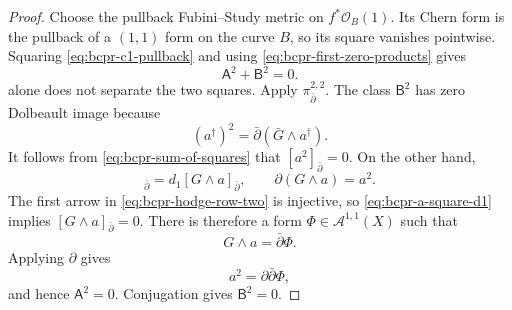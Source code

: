\begin{proof}
Choose the pullback Fubini--Study metric on
$f^*\mathcal O_B(1)$.  Its Chern form is the pullback of a $(1,1)$ form on
the curve $B$, so its square vanishes pointwise.  Squaring
\cref{eq:bcpr-c1-pullback} and using
\cref{eq:bcpr-first-zero-products} gives
\begin{equation}
 \mathsf A^2+\mathsf B^2=0.
\label{eq:bcpr-sum-of-squares}
\end{equation}
 alone does not separate the two
squares.  Apply $\pi_{\bar\partial}^{2,2}$.  The class
$\mathsf B^2$ has zero Dolbeault image because
\begin{equation}
 (a^\dagger)^2
 =\bar\partial(\bar G\wedge a^\dagger).
\label{eq:bcpr-b-square-dolbeault-zero}
\end{equation}
It follows from \cref{eq:bcpr-sum-of-squares} that
$[a^2]_{\bar\partial}=0$.  On the other hand,
\begin{equation}
 [a^2]_{\bar\partial}
 =d_1[G\wedge a]_{\bar\partial},
 \qquad
 \partial(G\wedge a)=a^2.
\label{eq:bcpr-a-square-d1}
\end{equation}
The first arrow in \cref{eq:bcpr-hodge-row-two} is injective, so
\cref{eq:bcpr-a-square-d1} implies
$[G\wedge a]_{\bar\partial}=0$.  There is therefore a form
$\Phi\in\mathcal A^{1,1}(X)$ such that
\begin{equation}
 G\wedge a=\bar\partial\Phi.
\label{eq:bcpr-phi-primitive}
\end{equation}
Applying $\partial$ gives
\begin{equation}
 a^2=\partial\bar\partial\Phi,
\label{eq:bcpr-a-square-bc-zero}
\end{equation}
and hence $\mathsf A^2=0$.  Conjugation gives
$\mathsf B^2=0$.


\end{proof}
